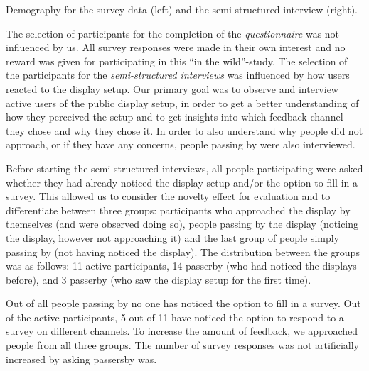 		\begin{table}[bh]
			\small
			\center
			

			\caption[Demographics of Field Study]{Demography for the survey data (left) and the semi-structured interview (right).}
			\label{table:demographics}
		\end{table}


		The selection of participants for the completion of the \textit{questionnaire} was not influenced by us. All survey responses were made in their own interest and no reward was given for participating in this ``in the wild''-study. The selection of the participants for the \textit{semi-structured interviews} was influenced by how users reacted to the display setup. Our primary goal was to observe and interview active users of the public display setup, in order to get a better understanding of how they perceived the setup and to get insights into which feedback channel they chose and why they chose it. In order to also understand why people did not approach, or if they have any concerns, people passing by were also interviewed. 
		
		Before starting the semi-structured interviews, all people participating were asked whether they had already noticed the display setup and/or the option to fill in a survey. 
		This allowed us to consider the novelty effect for evaluation and to differentiate between three groups: participants who approached the display by themselves (and were observed doing so), people passing by the display (noticing the display, however not approaching it) and the last group of people simply passing by (not having noticed the display). The distribution between the groups was as follows: 11 active participants, 14 passerby (who had noticed the displays before), and 3 passerby (who saw the display setup for the first time). 

		Out of all people passing by no one has noticed the option to fill in a survey. Out of the active participants, 5 out of 11 have noticed the option to respond to a survey on different channels.
		To increase the amount of feedback, we approached people from all three groups. The number of survey responses was not artificially increased by asking passersby was.
		






